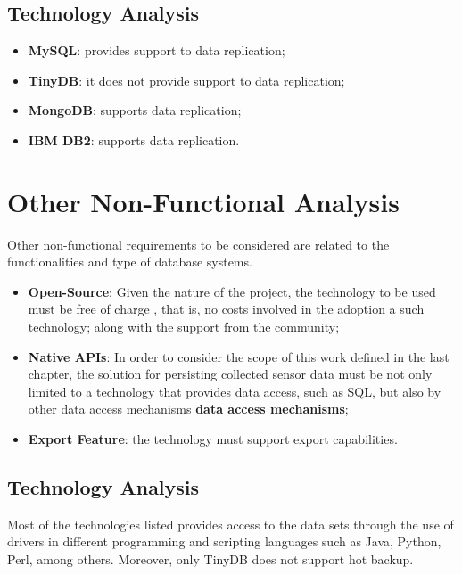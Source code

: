 \subsection{Technology Analysis}

\begin{itemize}
  \item \textbf{MySQL}: provides support to data replication;
  \item \textbf{TinyDB}: it does not provide support to data replication;
  \item \textbf{MongoDB}: supports data replication;
  \item \textbf{IBM DB2}: supports data replication.
\end{itemize}

\section{Other Non-Functional Analysis}

Other non-functional requirements to be considered are related to the
functionalities and type of database systems.

\begin{itemize}
  \item \textbf{Open-Source}: Given the nature of the project, the
  technology to be used must be free of charge \cite{open-source}, that is, no
  costs involved in the adoption a such technology; along with the support from
  the community;
  \item \textbf{Native APIs}: In order to consider the scope of this work
  defined in the last chapter, the solution for persisting collected sensor
  data must be not only limited to a technology that provides data access, such
  as SQL, but also by other data access mechanisms \textbf{data access
  mechanisms};
  \item \textbf{Export Feature}: the technology must support export
  capabilities.
\end{itemize}

\subsection{Technology Analysis}

Most of the technologies listed provides access to the data sets through the
use of drivers in different programming and scripting languages such as Java,
Python, Perl, among others. Moreover, only TinyDB does not support hot backup.

